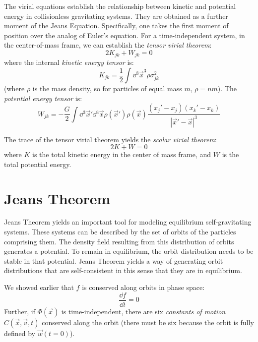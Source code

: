 The virial equations establish the relationship between kinetic
and potential energy in collisionless gravitating systems. They are
obtained as a further moment of the Jeans Equation. Specifically, one
takes the first moment of position over the analog of Euler's
equation. For a time-independent system, in the center-of-mass frame,
we can establish the {\it tensor virial theorem}:
\begin{equation}
2 K_{jk} + W_{jk} = 0
\end{equation}
where the internal {\it kinetic energy tensor} is:
\begin{equation}
K_{jk} = \frac{1}{2} \int \dd{}^3\vec{x}^3 \rho \sigma_{jk}^2
\end{equation}
(where $\rho$ is the mass density, so for particles of equal mass $m$,
$\rho = nm$). The {\it potential energy tensor} is:
\begin{equation}
W_{jk} = - \frac{G}{2} \int \dd{}^3\vec{x}'
\dd{}^3\vec{x} \rho(\vec{x}') \rho(\vec{x}) \frac{(x_j' - x_j)(x_k' -
x_k)}{\left| \vec{x}' - \vec{x}\right|^3}
\end{equation}

The trace of the tensor virial theorem yields the {\it scalar virial
theorem}:
\begin{equation}
2K + W = 0
\end{equation}
where $K$ is the total kinetic energy in the center of mass frame, and
$W$ is the total potential energy. 

\section{Jeans Theorem}

Jeans Theorem yields an important tool for modeling equilibrium
self-gravitating systems. These systems can be described by the set of
orbits of the particles comprising them. The density field resulting
from this distribution of orbits generates a potential. To remain in
equilibrium, the orbit distribution needs to be stable in that
potential. Jeans Theorem yields a way of generating orbit
distributions that are self-consistent in this sense that they are in
equilibrium.

We showed earlier that $f$ is conserved along orbits in phase space:
\begin{equation}
\frac{\dd{f}}{\dd{t}} = 0
\end{equation}
Further, if $\Phi(\vec{x})$ is time-independent, there are six {\it
constants of motion} $C(\vec{x}, \vec{v}, t)$ conserved along the
orbit (there must be six because the orbit is fully defined by
$\vec{w}(t=0)$).

